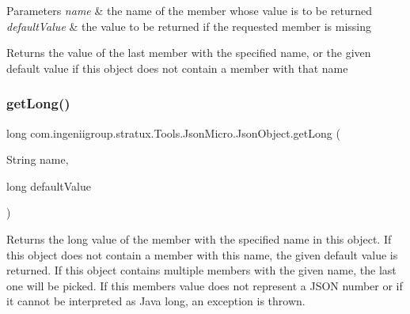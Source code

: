 \begin{DoxyParams}{Parameters}
{\em name} & the name of the member whose value is to be returned \\
\hline
{\em default\+Value} & the value to be returned if the requested member is missing \\
\hline
\end{DoxyParams}
\begin{DoxyReturn}{Returns}
the value of the last member with the specified name, or the given default value if this object does not contain a member with that name 
\end{DoxyReturn}
\mbox{\label{classcom_1_1ingeniigroup_1_1stratux_1_1_tools_1_1_json_micro_1_1_json_object_ad1f031b0cf55dfec084eeecbbcf2e134}} 
\subsubsection{\texorpdfstring{get\+Long()}{getLong()}}
{\footnotesize\ttfamily long com.\+ingeniigroup.\+stratux.\+Tools.\+Json\+Micro.\+Json\+Object.\+get\+Long (\begin{DoxyParamCaption}\item[{String}]{name,  }\item[{long}]{default\+Value }\end{DoxyParamCaption})}

Returns the {\ttfamily long} value of the member with the specified name in this object. If this object does not contain a member with this name, the given default value is returned. If this object contains multiple members with the given name, the last one will be picked. If this member\textquotesingle{}s value does not represent a J\+S\+ON number or if it cannot be interpreted as Java {\ttfamily long}, an exception is thrown.


